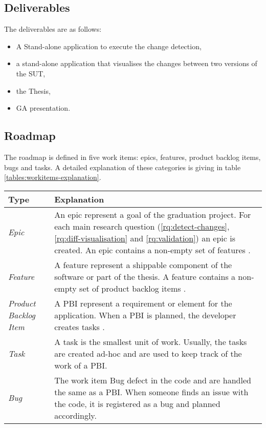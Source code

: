 \pagebreak
\subsection{Deliverables} \label{deliverables} 
The deliverables are as follows:
\begin{itemize}[noitemsep]
    \item A Stand-alone application to execute the change detection,
    \item a stand-alone application that visualises the changes between two versions of the SUT,
    \item the Thesis,
    \item GA presentation.
\end{itemize}

\subsection{Roadmap} \label{roadmap}
The roadmap is defined in five work items: epics, features, product backlog items, bugs and tasks. A detailed explanation of these categories is giving in table \ref{tables:workitems-explanation}.

\begingroup
\captionsetup{type=table}
\begin{tabularx}{\linewidth}{ 
  | >{\raggedright\arraybackslash}l
  | >{\raggedright\arraybackslash}X  |}
    \hline
    Type & Explanation \\
    \hline
    \hline
    
    \emph{Epic} & An epic represent a goal of the graduation project. For each main research question (\ref{rq:detect-changes}, \ref{rq:diff-visualisation} and \ref{rq:validation}) an epic is created. An epic contains a non-empty set of features \cite{epics-features}.\\
    \hline

    \emph{Feature} & A feature represent a shippable component of the software or part of the thesis. A feature contains a non-empty set of product backlog items \cite{epics-features}. \\
    \hline
    
    \emph{Product Backlog Item} & A \acrfull{PBI} represent a requirement or element for the application. When a PBI is planned, the developer creates tasks \cite{user-story}. \\
    \hline
    
    \emph{Task} & A task is the smallest unit of work. Usually, the tasks are created ad-hoc and are used to keep track of the work of a PBI.  \\
    \hline

    \emph{Bug} & The work item Bug defect in the code and are handled the same as a PBI. When someone finds an issue with the code, it is registered as a bug and planned accordingly.\\
    \hline
\end{tabularx}
\label{tables:workitems-explanation}
\endgroup

